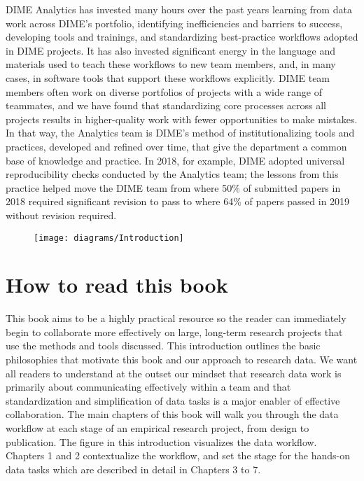 DIME Analytics has invested many hours over the past years
learning from data work across DIME's portfolio,
identifying inefficiencies and barriers to success,
developing tools and trainings, and standardizing best-practice workflows adopted in DIME projects.
It has also invested significant energy in the language and materials
used to teach these workflows to new team members,
and, in many cases, in software tools that support these workflows explicitly.
DIME team members often work on diverse portfolios of projects
with a wide range of teammates, and we have found
that standardizing core processes across all projects
results in higher-quality work with fewer opportunities to make mistakes.
In that way, the Analytics team is DIME's method of institutionalizing
tools and practices, developed and refined over time,
that give the department a common base of knowledge and practice.
In 2018, for example, DIME adopted universal reproducibility checks
conducted by the Analytics team;
the lessons from this practice helped move the DIME team
from where 50\% of submitted papers in 2018
required significant revision to pass
to where 64\% of papers passed in 2019 without revision required.




	\begin{figure}
		\centering
		\texttt{[image: diagrams/Introduction]}
		\label{fig:intro}
	\end{figure}


\section{How to read this book}
This book aims to be a highly practical resource so the reader can
immediately begin to collaborate more effectively
on large, long-term research projects
that use the methods and tools discussed.
This introduction outlines the basic philosophies
that motivate this book and our approach to research data.
We want all readers to understand at the outset our mindset
that research data work is primarily about
communicating effectively within a team
and that standardization and simplification of data tasks
is a major enabler of effective collaboration.
The main chapters of this book will walk you through the data workflow at each stage
of an empirical research project, from design to publication.
The figure in this introduction visualizes the data workflow.
Chapters 1 and 2 contextualize the workflow,
and set the stage for the hands-on data tasks
which are described in detail in Chapters 3 to 7.


